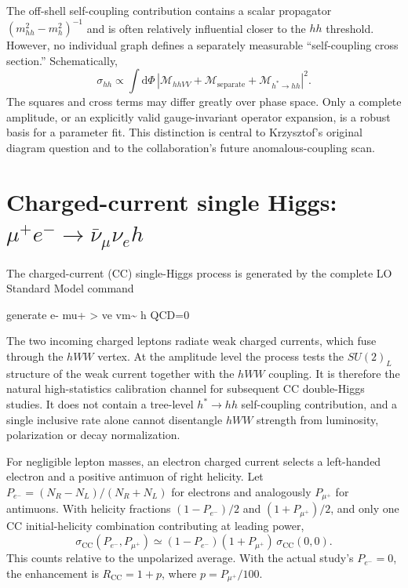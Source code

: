 \documentclass[12pt,a4paper]{article}
\newcommand{\newnote}{\clearpage}
\newcommand{\CC}{\mathrm{CC}}
\begin{document}
The off-shell self-coupling contribution contains a scalar propagator $(m_{hh}^2-m_h^2)^{-1}$ and is often relatively influential closer to the $hh$ threshold. However, no individual graph defines a separately measurable ``self-coupling cross section.'' Schematically,
\begin{equation}
\sigma_{hh}\propto\int\mathrm d\Phi\,
\left|\mathcal M_{hhVV}+\mathcal M_{\mathrm{separate}}+\mathcal M_{h^*\to hh}\right|^2.
\end{equation}
The squares and cross terms may differ greatly over phase space. Only a complete amplitude, or an explicitly valid gauge-invariant operator expansion, is a robust basis for a parameter fit. This distinction is central to Krzysztof's original diagram question and to the collaboration's future anomalous-coupling scan.




\newnote

\section{Charged-current single Higgs: $\mu^+e^-\to\bar\nu_\mu\nu_e h$}
The charged-current (CC) single-Higgs process is generated by the complete LO Standard Model command
\begin{center}\ttfamily\small generate e- mu+ > ve vm\textasciitilde{} h QCD=0\end{center}
The two incoming charged leptons radiate weak charged currents, which fuse through the $hWW$ vertex. At the amplitude level the process tests the $SU(2)_L$ structure of the weak current together with the $hWW$ coupling. It is therefore the natural high-statistics calibration channel for subsequent CC double-Higgs studies. It does not contain a tree-level $h^*\to hh$ self-coupling contribution, and a single inclusive rate alone cannot disentangle $hWW$ strength from luminosity, polarization or decay normalization.

For negligible lepton masses, an electron charged current selects a left-handed electron and a positive antimuon of right helicity. Let $P_{e^-}=(N_R-N_L)/(N_R+N_L)$ for electrons and analogously $P_{\mu^+}$ for antimuons. With helicity fractions $(1-P_{e^-})/2$ and $(1+P_{\mu^+})/2$, and only one CC initial-helicity combination contributing at leading power,
\begin{equation}\label{eq:ccpol}
\sigma_{\CC}(P_{e^-},P_{\mu^+})\simeq
(1-P_{e^-})(1+P_{\mu^+})\,\sigma_{\CC}(0,0).
\end{equation}
This counts relative to the unpolarized average. With the actual study's $P_{e^-}=0$, the enhancement is $R_{\CC}=1+p$, where $p=P_{\mu^+}/100$.
\end{document}
